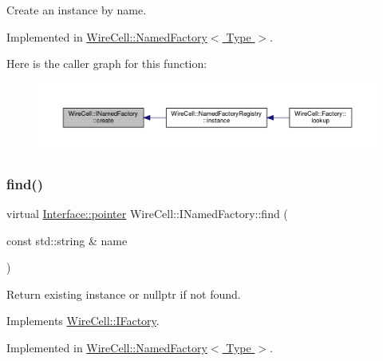 Create an instance by name. 



Implemented in \hyperlink{class_wire_cell_1_1_named_factory_aaf8b55bd335453198f23f412b8174419}{Wire\+Cell\+::\+Named\+Factory$<$ Type $>$}.

Here is the caller graph for this function\+:
\nopagebreak
\begin{figure}[H]
\begin{center}
\leavevmode
\includegraphics[width=350pt]{class_wire_cell_1_1_i_named_factory_aab305aa4c3d65450f97f95b26475d3fe_icgraph}
\end{center}
\end{figure}
\mbox{\label{class_wire_cell_1_1_i_named_factory_a4e87a7c8957a57aa6d23fef2f9e1dbd3}} 
\subsubsection{\texorpdfstring{find()}{find()}}
{\footnotesize\ttfamily virtual \hyperlink{class_wire_cell_1_1_interface_a09c548fb8266cfa39afb2e74a4615c37}{Interface\+::pointer} Wire\+Cell\+::\+I\+Named\+Factory\+::find (\begin{DoxyParamCaption}\item[{const std\+::string \&}]{name }\end{DoxyParamCaption})\hspace{0.3cm}{\ttfamily [pure virtual]}}



Return existing instance or nullptr if not found. 



Implements \hyperlink{class_wire_cell_1_1_i_factory_a4365897d9d1e7951ce53c553dba3e116}{Wire\+Cell\+::\+I\+Factory}.



Implemented in \hyperlink{class_wire_cell_1_1_named_factory_a1c0faed7ba682bd801069997d60ea81b}{Wire\+Cell\+::\+Named\+Factory$<$ Type $>$}.

